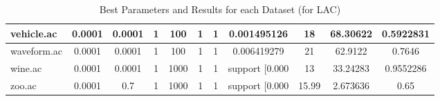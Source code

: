 \begin{table}[htbp]
\begin{tabular}{|l|c|c|c|c|c|c|c|c|c|c|}
		\hline
		vehicle.ac     & 0.0001   & 0.0001      & 1              & 100                 & 1             & 1             & 0.001495126    & 18             & 68.30622       & 0.5922831      \\
		\hline
		waveform.ac    & 0.0001   & 0.0001      & 1              & 100                 & 1             & 1             & 0.006419279    & 21             & 62.9122        & 0.7646         \\
		\hline
		wine.ac        & 0.0001   & 0.0001      & 1              & 1000                & 1             & 1             & support [0.000 & 13             & 33.24283       & 0.9552286      \\
		\hline
		zoo.ac         & 0.0001   & 0.7         & 1              & 1000                & 1             & 1             & support [0.000 & 15.99          & 2.673636       & 0.65           \\
		\hline
		\end{tabular}
	\caption{Best Parameters and Results for each Dataset (for LAC)}
	\label{tab:best_runs_for_each_db_lac}
\end{table}